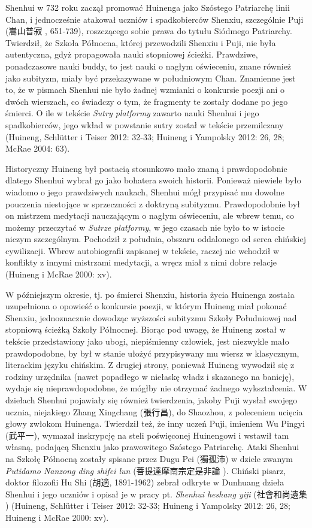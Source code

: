 Shenhui w 732 roku zaczął promować Huinenga jako Szóstego Patriarchę linii Chan, i jednocześnie atakował uczniów i spadkobierców Shenxiu, szczególnie Puji (嵩山普寂 , 651-739), roszczącego sobie prawa do tytułu Siódmego Patriarchy. Twierdził, że Szkoła Północna, której przewodzili Shenxiu i Puji, nie była autentyczna, gdyż propagowała nauki stopniowej ścieżki. Prawdziwe, ponadczasowe nauki buddy, to jest nauki o nagłym oświeceniu, znane również jako subityzm, miały być przekazywane w południowym Chan. Znamienne jest to, że w pismach Shenhui nie było żadnej wzmianki o konkursie poezji ani o dwóch wierszach, co świadczy o tym, że fragmenty te zostały dodane po jego śmierci. O ile w tekście \textit{Sutry platformy} zawarto nauki Shenhui i jego spadkobierców, jego wkład w powstanie sutry został w tekście przemilczany (Huineng, Schlütter i Teiser 2012: 32-33; Huineng i Yampolsky 2012: 26, 28; McRae 2004: 63).

Historyczny Huineng był postacią stosunkowo mało znaną i prawdopodobnie dlatego Shenhui wybrał go jako bohatera swoich historii. Ponieważ niewiele było wiadomo o jego prawdziwych naukach, Shenhui mógł przypisać mu dowolne pouczenia niestojące w sprzeczności z doktryną subityzmu. Prawdopodobnie był on mistrzem medytacji nauczającym o nagłym oświeceniu, ale wbrew temu, co możemy przeczytać w \textit{Sutrze platformy}, w jego czasach nie było to w istocie niczym szczególnym. Pochodził z południa, obszaru oddalonego od serca chińskiej cywilizacji. Wbrew autobiografii zapisanej w tekście, raczej nie wchodził w konflikty z innymi mistrzami medytacji, a wręcz miał z nimi dobre relacje (Huineng i McRae 2000: xv).

W późniejszym okresie, tj. po śmierci Shenxiu, historia życia Huinenga została uzupełniona o opowieść o konkursie poezji, w którym Huineng miał pokonać Shenxiu, jednoznacznie dowodząc wyższości subityzmu Szkoły Południowej nad stopniową ścieżką Szkoły Północnej. Biorąc pod uwagę, że Huineng został w tekście przedstawiony jako ubogi, niepiśmienny człowiek, jest niezwykle mało prawdopodobne, by był w stanie ułożyć przypisywany mu wiersz w klasycznym, literackim języku chińskim. Z drugiej strony, ponieważ Huineng wywodził się z rodziny urzędnika (nawet popadłego w niełaskę władz i skazanego na banicję), wydaje się nieprawdopodobne, że mógłby nie otrzymać żadnego wykształcenia. W dziełach Shenhui pojawiały się również twierdzenia, jakoby Puji wysłał swojego ucznia, niejakiego Zhang Xingchang (張行昌), do Shaozhou, z poleceniem ucięcia głowy zwłokom Huinenga. Twierdził też, że inny uczeń Puji, imieniem Wu Pingyi (武平一), wymazał inskrypcję na steli poświęconej Huinengowi i wstawił tam własną, podającą Shenxiu jako prawowitego Szóstego Patriarchę. Ataki Shenhui na Szkołę Północną zostały spisane przez Dugu Pei (獨孤沛) w dziele zwanym \textit{Putidamo Nanzong ding shifei lun} (菩提達摩南宗定是非論 ). Chiński pisarz, doktor filozofii Hu Shi (胡適, 1891-1962) zebrał odkryte w Dunhuang dzieła Shenhui i jego uczniów i opisał je w pracy pt. \textit{Shenhui heshang yiji} (社會和尚遺集 ) %
(Huineng, Schlütter i Teiser 2012: 32-33; Huineng i Yampolsky 2012: 26, 28; Huineng i McRae 2000: xv).

